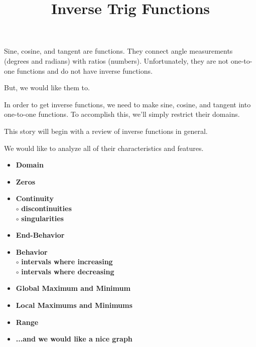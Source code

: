 \documentclass{ximera}
\title{Inverse Trig Functions}
\begin{document}
\begin{abstract}
%
\end{abstract}
\maketitle




Sine, cosine, and tangent are functions. They connect angle measurements (degrees and radians) with ratios (numbers). Unfortunately, they are not one-to-one functions and do not have inverse functions. 

But, we would like them to.

In order to get inverse functions, we need to make sine, cosine, and tangent into one-to-one functions.  To accomplish this, we'll simply restrict their domains. 


This story will begin with a review of inverse functions in general.



We would like to analyze all of their characteristics and features. 



\begin{itemize}
     \item \textbf{\textcolor{red!70!black}{Domain}} 
     \item \textbf{\textcolor{red!70!black}{Zeros}} 
     \item \textbf{\textcolor{red!70!black}{Continuity}} \\
     \text{    }$\circ$ \textbf{\textcolor{purple!85!blue}{discontinuities}}\\
     \text{    }$\circ$ \textbf{\textcolor{purple!85!blue}{singularities}}\\
     \item \textbf{\textcolor{red!70!black}{End-Behavior}} 
     \item \textbf{\textcolor{red!70!black}{Behavior}} \\
     \text{    }$\circ$ \textbf{\textcolor{purple!85!blue}{intervals where increasing}}\\
     \text{    }$\circ$ \textbf{\textcolor{purple!85!blue}{intervals where decreasing}}\\
     \item \textbf{\textcolor{red!70!black}{Global Maximum and Minimum}} 
     \item \textbf{\textcolor{red!70!black}{Local Maximums and Minimums}} 
     \item \textbf{\textcolor{red!70!black}{Range}} 
     \item \textbf{\textcolor{blue!55!black}{...and we would like a nice graph}} 
\end{itemize}
\end{document}

